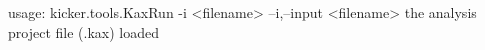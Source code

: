 usage: kicker.tools.KaxRun -i <filename>
 --i,--input <filename>
        the analysis project file (.kax) loaded